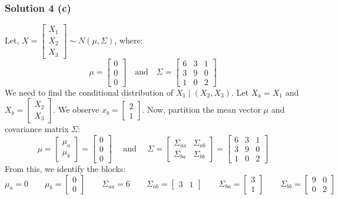 \documentclass{article}
\begin{document}
\subsubsection*{Solution 4 (c)}
Let, $X = \begin{bmatrix} X_1 \\ X_2 \\ X_3 \end{bmatrix} \sim N(\mu, \Sigma)$, where:
$$ \mu = \begin{bmatrix} 0 \\ 0 \\ 0 \end{bmatrix} \quad \text{and} \quad \Sigma = \begin{bmatrix} 6 & 3 & 1 \\ 3 & 9 & 0 \\ 1 & 0 & 2 \end{bmatrix} $$
We need to find the conditional distribution of $X_1 \mid (X_2, X_3)$.
Let $X_a = X_1$ and $X_b = \begin{bmatrix} X_2 \\ X_3 \end{bmatrix}$. We observe $x_b = \begin{bmatrix} 2 \\ 1 \end{bmatrix}$.
Now, partition the mean vector $\mu$ and covariance matrix $\Sigma$:
$$ \mu = \begin{bmatrix} \mu_a \\ \mu_b \end{bmatrix} = \begin{bmatrix} 0 \\ \hline 0 \\ 0 \end{bmatrix} \quad \text{ and }\quad \Sigma = \begin{bmatrix} \Sigma_{aa} & \Sigma_{ab} \\ \Sigma_{ba} & \Sigma_{bb} \end{bmatrix} = \left[ \begin{array}{c|cc} 6 & 3 & 1 \\ \hline 3 & 9 & 0 \\ 1 & 0 & 2 \end{array} \right] $$
From this, we identify the blocks:
$$\mu_a = 0 \qquad \mu_b = \begin{bmatrix} 0 \\ 0 \end{bmatrix} \qquad \Sigma_{aa} = 6 \qquad \Sigma_{ab} = \begin{bmatrix} 3 & 1 \end{bmatrix} \qquad \Sigma_{ba} = \begin{bmatrix} 3 \\ 1 \end{bmatrix} \qquad \Sigma_{bb} = \begin{bmatrix} 9 & 0 \\ 0 & 2 \end{bmatrix}$$
\end{document}
